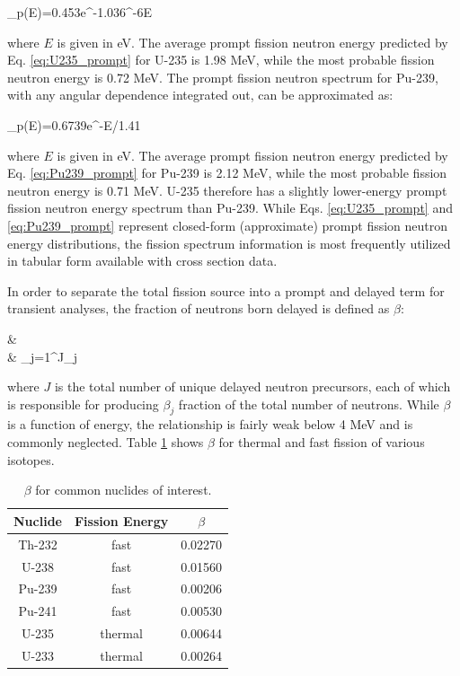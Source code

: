 \beq
\label{eq:U235_prompt}
\chi_p(E)=0.453e^{-1.036^{-6}E}
\eeq

where \(E\) is given in eV. The average prompt fission neutron energy predicted by Eq. \eqref{eq:U235_prompt} for U-235 is 1.98 MeV, while the most probable fission neutron energy is 0.72 MeV. The prompt fission neutron spectrum for Pu-239, with any angular dependence integrated out, can be approximated as:

\beq
\label{eq:Pu239_prompt}
\chi_p(E)=0.6739e^{-E/1.41}
\eeq

where \(E\) is given in eV. The average prompt fission neutron energy predicted by Eq. \eqref{eq:Pu239_prompt} for Pu-239 is 2.12 MeV, while the most probable fission neutron energy is 0.71 MeV. U-235 therefore has a slightly lower-energy prompt fission neutron energy spectrum than Pu-239. While Eqs. \eqref{eq:U235_prompt} and \eqref{eq:Pu239_prompt} represent closed-form (approximate) prompt fission neutron energy distributions, the fission spectrum information is most frequently utilized in tabular form available with cross section data.

In order to separate the total fission source into a prompt and delayed term for transient analyses, the fraction of neutrons born delayed is defined as \(\beta\):

\beqa
\label{eq:BetaDef}
\beta\equiv&\ \\
\equiv& \sum_{j=1}^J\beta_j
\eeqa

where \(J\) is the total number of unique delayed neutron precursors, each of which is responsible for producing \(\beta_j\) fraction of the total number of neutrons. While \(\beta\) is a function of energy, the relationship is fairly weak below 4 MeV and is commonly neglected. Table \ref{table:beta} shows \(\beta\) for thermal and fast fission of various isotopes.

\begin{table}[H] 
\caption{\(\beta\) for common nuclides of interest.}
\centering
\begin{tabular}{c c c}
\hline\hline
Nuclide & Fission Energy & \(\beta\)\\
\hline
Th-232 & fast & 0.02270\\
U-238 & fast  & 0.01560\\
Pu-239 & fast & 0.00206\\
Pu-241 & fast & 0.00530 \\
U-235 & thermal & 0.00644 \\
U-233 & thermal & 0.00264 \\
\hline
\end{tabular}
\label{table:beta}
\end{table}

